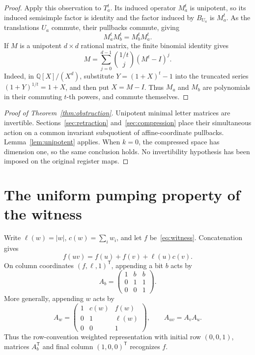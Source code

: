 \documentclass[acmlarge,screen,11pt,nonacm]{acmart}
\newcommand{\Q}{\mathbb{Q}}
\theoremstyle{definition}
\begin{document}
\begin{proof}
Apply this observation to $T_a^t$. Its induced operator $M_a^t$ is unipotent, so its induced semisimple factor is identity and the factor induced by $B_{U_a}$ is $M_a^t$. As the translations $U_a$ commute, their pullbacks commute, giving
\[
 M_a^tM_b^t=M_b^tM_a^t.
\]
If $M$ is a unipotent $d\times d$ rational matrix, the finite binomial identity gives
\begin{equation}\label{eq:root}
 M=\sum_{j=0}^{d-1}\binom{1/t}{j}(M^t-I)^j.
\end{equation}
Indeed, in $\Q[X]/(X^d)$, substitute $Y=(1+X)^t-1$ into the truncated series $(1+Y)^{1/t}=1+X$, and then put $X=M-I$. Thus $M_a$ and $M_b$ are polynomials in their commuting $t$-th powers, and commute themselves.
\end{proof}

\begin{proof}[Proof of Theorem~\ref{thm:obstruction}]
Unipotent minimal letter matrices are invertible. Sections~\ref{sec:retraction} and~\ref{sec:compression} place their simultaneous action on a common invariant subquotient of affine-coordinate pullbacks. Lemma~\ref{lem:unipotent} applies. When $k=0$, the compressed space has dimension one, so the same conclusion holds. No invertibility hypothesis has been imposed on the original register maps.
\end{proof}

\section{The uniform pumping property of the witness}\label{sec:pumping}
Write $\ell(w)=|w|$, $c(w)=\sum_i w_i$, and let $f$ be~\eqref{eq:witness}. Concatenation gives
\begin{equation}\label{eq:concat}
 f(uv)=f(u)+f(v)+\ell(u)c(v).
\end{equation}
On column coordinates $(f,\ell,1)^\mathsf{T}$, appending a bit $b$ acts by
\[
 A_b=\begin{pmatrix}1&b&b\\0&1&1\\0&0&1\end{pmatrix}.
\]
More generally, appending $w$ acts by
\begin{equation}\label{eq:Aw}
 A_w=\begin{pmatrix}1&c(w)&f(w)\\0&1&\ell(w)\\0&0&1\end{pmatrix},
 \qquad A_{uv}=A_vA_u.
\end{equation}
Thus the row-convention weighted representation with initial row $(0,0,1)$, matrices $A_b^\mathsf{T}$ and final column $(1,0,0)^\mathsf{T}$ recognizes $f$.
\end{document}
